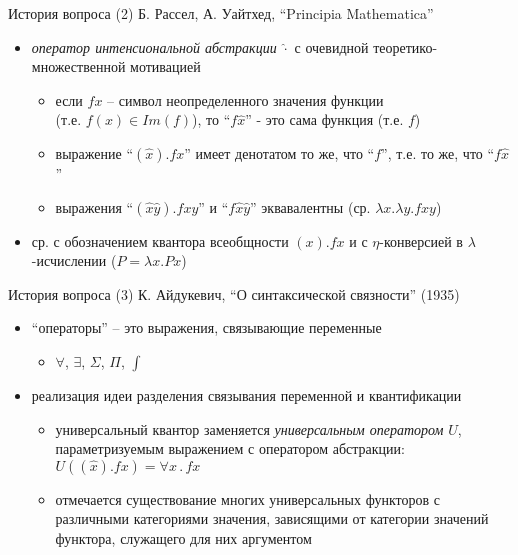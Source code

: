 \documentclass{beamer}
\begin{document}
\begin{frame}{История вопроса (2)}
Б. Рассел, А. Уайтхед, ``Principia Mathematica''
\bigskip
\begin{itemize}
    \item \textit{оператор интенсиональной абстракции} $\hat{\cdot}$ с очевидной теоретико-множественной мотивацией
    \medskip
    \begin{itemize}
        \item если $fx$ -- символ неопределенного значения функции\\(т.е. $f(x) \in Im(f)$), то ``$f\hat{x}$'' - это сама функция (т.е. $f$)
        \medskip
        \item выражение ``$(\hat{x}).fx$'' имеет денотатом то же, что ``$f$'', т.е. то же, что ``$f\hat{x}$''
        \medskip
        \item выражения ``$(\hat{x}\hat{y}).fxy$'' и ``$f\hat{x}\hat{y}$'' эквавалентны (ср. $\lambda x.\lambda y.fxy$)
    \end{itemize}
    \medskip
    \item ср. с обозначением квантора всеобщности $(x).fx$ и с $\eta$-конверсией в $\lambda$-исчислении ($P = \lambda x . Px$)
\end{itemize}
\bigskip

\end{frame}

\begin{frame}{История вопроса (3)}
К. Айдукевич, ``О синтаксической связности'' (1935)
\bigskip
\begin{itemize}
	\item ``операторы'' -- это выражения, связывающие переменные 
	\medskip
	    \begin{itemize}
	        \item $\forall$, $\exists$, $\Sigma$, $\Pi$, $\int$
	    \end{itemize}
    \medskip
	\item реализация идеи разделения связывания переменной и квантификации
	    \medskip
	    \begin{itemize}
	        \item универсальный квантор заменяется \textit{универсальным оператором} $U$, параметризуемым выражением с оператором абстракции: $U((\hat{x}).fx) = \forall x \, . \, fx$
	        \medskip
	        \item отмечается существование многих универсальных функторов с различными категориями значения, зависящими от категории значений функтора, служащего для них аргументом
	    \end{itemize}
\end{itemize}
\end{frame}
\end{document}
